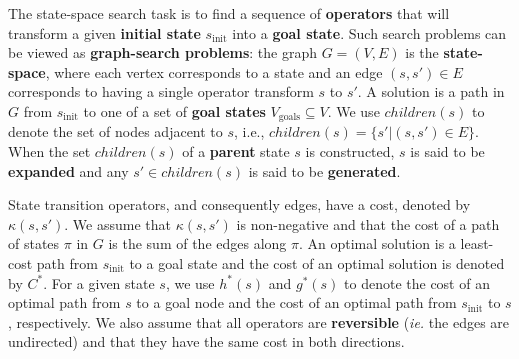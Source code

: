 \documentclass[letterpaper]{article}
\begin{document}

The state-space search task is to find a sequence of \textbf{operators} that will transform  a given \textbf{initial state} $s_{\mathrm{init}}$ into a \textbf{goal state}. Such search problems can be viewed as \textbf{graph-search problems}: the graph $G = (V, E)$ is the \textbf{state-space}, where each vertex corresponds to a state and an edge $(s,s')\in E$ corresponds to having a single operator transform $s$ to $s'$.
A solution is a path in $G$ from $s_{\mathrm{init}}$ to one of a set of \textbf{goal states} $V_{\mathrm{goals}}\subseteq V$. We use $children(s)$ to denote the set of nodes adjacent to $s$, i.e., $children(s) = \{ s' | (s,s') \in E\}$.  When the
set $children(s)$ of a \textbf{parent} state $s$ is constructed, $s$ is said to be \textbf{expanded} and any $s'\in children(s)$ is said to be \textbf{generated}.

State transition operators, and consequently edges, have a cost, denoted by $\kappa(s, s')$. We assume that $\kappa(s, s')$ is non-negative and that the cost of a path of states $\pi$ in $G$ is the sum of the edges along $\pi$. An optimal solution is a least-cost path from $s_{\mathrm{init}}$ to a goal state and the cost of an optimal solution is denoted by $C^*$. For a given state $s$, we use $h^*(s)$ and $g^*(s)$ to denote the cost of an optimal path from $s$ to a goal node and the cost of an optimal path from $s_{\mathrm{init}}$ to $s$, respectively. %
We also assume that all operators are \textbf{reversible} (\textit{ie.} the edges are undirected) and that they have the same cost in both directions.
\end{document}
